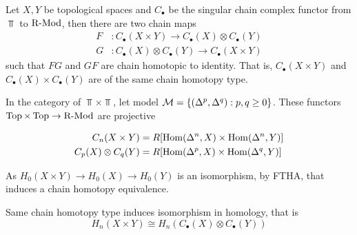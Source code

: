 \documentclass{article}
\begin{document}
\begin{theorem}
    Let $X, Y$ be topological spaces and $C_\bullet$ be the singular chain complex functor from $\Top$ to $\operatorname{R-Mod}$, then there are two chain maps
    \begin{align*}
        F&: C_\bullet(X \times Y) \to C_\bullet(X) \otimes C_\bullet(Y) \\
        G&: C_\bullet(X) \otimes C_\bullet(Y) \to C_\bullet(X \times Y)
    \end{align*}
    such that $FG$ and $GF$ are chain homotopic to identity. That is, $C_\bullet(X \times Y)$ and $C_\bullet(X) \times C_\bullet(Y)$ are of the same chain homotopy type.
\end{theorem}

\begin{longproof}
    
    In the category of $\Top \times \Top$, let model $\mathcal{M} = \{(\Delta^p, \Delta^q): p, q \geq 0\}$. These functors $\operatorname{Top} \times \operatorname{Top} \to \operatorname{R-Mod}$ are projective

    \begin{align*}
        C_n(X \times Y) &= R [\operatorname{Hom}(\Delta^n, X) \times \operatorname{Hom}(\Delta^n, Y)] \\
        C_p(X) \otimes C_q(Y) &= R [\operatorname{Hom}(\Delta^p, X) \times \operatorname{Hom}(\Delta^q, Y)] \\
    \end{align*}

    As $H_0(X \times Y) \to H_0(X) \to H_0(Y)$ is an isomorphism, by FTHA, that induces a chain homotopy equivalence.
        
    \begin{center}
    \end{center}
\end{longproof}

\begin{corollary}
    Same chain homotopy type induces isomorphism in homology, that is
    $$
        H_n(X \times Y) \cong H_n(C_\bullet(X) \otimes C_\bullet(Y))
    $$
\end{corollary}
\end{document}
